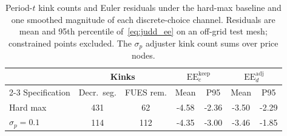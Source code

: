 \begin{table}[htbp]
\centering
\caption{Period-$t$ kink counts and Euler residuals under the hard-max baseline and one smoothed magnitude of each discrete-choice channel. Residuals are mean and 95th percentile of~\eqref{eq:judd_ee} on an off-grid test mesh; constrained points excluded. The $\sigma_p$ adjuster kink count sums over price nodes.}
\label{tab:smoothing_euler}
\small
\begin{tabular}{lcccccc}
\hline
 & \multicolumn{2}{c}{Kinks} & \multicolumn{2}{c}{$\mathrm{EE}_c^{\mathrm{keep}}$} & \multicolumn{2}{c}{$\mathrm{EE}_d^{\mathrm{adj}}$} \\
\cline{2-3}\cline{4-5}\cline{6-7}
Specification & Decr.\ seg. & FUES rem. & Mean & P95 & Mean & P95 \\
\hline
Hard max & 431 & 62 & -4.58 & -2.36 & -3.50 & -2.29 \\
$\sigma_{p} = 0.1$ & 114 & 112 & -4.35 & -3.00 & -3.46 & -1.85 \\
\hline
\end{tabular}
\end{table}
